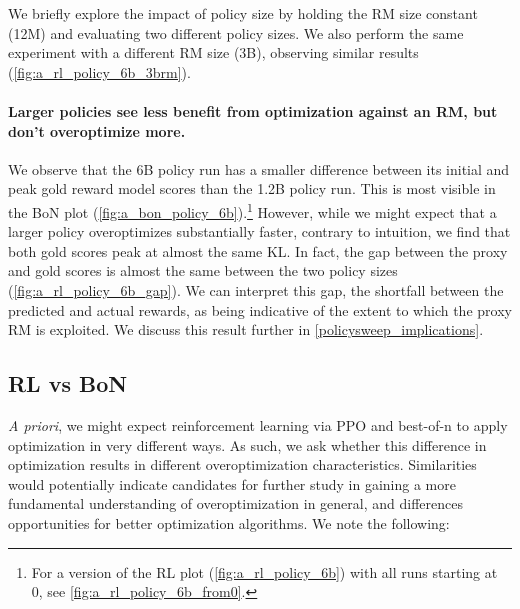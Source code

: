 \documentclass{article}
\theoremstyle{plain}
\begin{document}
We briefly explore the impact of policy size by holding the RM size constant (12M) and evaluating two different policy sizes. We also perform the same experiment with a different RM size (3B), observing similar results (\cref{fig:a_rl_policy_6b_3brm}). 

\paragraph{Larger policies see less benefit from optimization against an RM, but don't overoptimize more.} We observe that the 6B policy run has a smaller difference between its initial and peak gold reward model scores than the 1.2B policy run. This is most visible in the BoN plot (\cref{fig:a_bon_policy_6b}).\footnote{For a version of the RL plot (\cref{fig:a_rl_policy_6b}) with all runs starting at 0, see \cref{fig:a_rl_policy_6b_from0}.} However, while we might expect that a larger policy overoptimizes substantially faster, contrary to intuition, we find that both gold scores peak at almost the same KL. In fact, the gap between the proxy and gold scores is almost the same between the two policy sizes (\cref{fig:a_rl_policy_6b_gap}). We can interpret this gap, the shortfall between the predicted and actual rewards, as being indicative of the extent to which the proxy RM is exploited. We discuss this result further in \cref{policysweep_implications}.



\subsection{RL vs BoN}\label{rl_vs_bon}









\textit{A priori}, we might expect reinforcement learning via PPO \citep{schulman2017proximal} and best-of-n to apply optimization in very different ways. As such, we ask whether this difference in optimization results in different overoptimization characteristics. Similarities would potentially indicate candidates for further study in gaining a more fundamental understanding of overoptimization in general, and differences opportunities for better optimization algorithms. We note the following:
\end{document}

